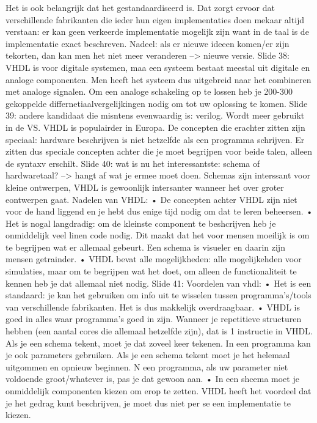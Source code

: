 \documentclass[10pt,a4paper]{book}
\begin{document}
Het is ook belangrijk dat het gestandaardiseerd is. Dat zorgt ervoor dat verschillende fabrikanten die ieder hun eigen implementaties doen mekaar altijd verstaan: er kan geen verkeerde implementatie mogelijk zijn want in de taal is de implementatie exact beschreven. Nadeel: als er nieuwe ideeen komen/er zijn tekorten, dan kan men het niet meer veranderen --> nieuwe versie. 
Slide 38: VHDL is voor digitale systemen, maa een systeem bestaat meestal uit digitale en analoge componenten. Men heeft het systeem dus uitgebreid naar het combineren met analoge signalen. Om een analoge schakeling op te lossen heb je 200-300 gekoppelde differnetiaalvergelijkingen nodig om tot uw oplossing te komen. 
Slide 39: andere kandidaat die misntens evenwaardig is: verilog. Wordt meer gebruikt in de VS. VHDL is populairder in Europa. De concepten die erachter zitten zijn speciaal: hardware beschrijven is niet hetzelfde als een programma schrijven. Er zitten dus speciale concepten achter die je moet begrijpen voor beide talen, alleen de syntaxv erschilt. 
Slide 40: wat is nu het interessantste: schema of hardwaretaal? --> hangt af wat je ermee moet doen. Schemas zijn interssant voor kleine ontwerpen, VHDL is gewoonlijk intersanter wanneer het over groter eontwerpen gaat.
Nadelen van VHDL:
	• De concepten achter VHDL zijn niet voor de hand liggend en je hebt dus enige tijd nodig om dat te leren beheersen. 
	• Het is nogal langdradig: om de kleinste component te beshcrijven heb je onmiddelijk veel linen code nodig. Dit maakt dat het voor mensen moeilijk is om te begrijpen wat er allemaal gebeurt. Een schema is visueler en daarin zijn mensen getrainder.
	• VHDL bevat alle mogelijkheden: alle mogelijkehden voor simulaties, maar om te begrijpen wat het doet, om alleen de functionaliteit te kennen heb je dat allemaal niet nodig.
Slide 41: Voordelen van vhdl:
	• Het is een standaard: je kan het gebruiken om info uit te wisselen tussen programma's/tools van verschillende fabrikanten. Het is dus makkelijk overdraagbaar.
	• VHDL is goed in alles waar programma's goed in zijn. Wanneer je repetitieve structuren hebben (een aantal cores die allemaal hetzelfde zijn), dat is 1 instructie in VHDL. Als je een schema tekent, moet je dat zoveel keer tekenen. In een programma kan je ook parameters gebruiken. Als je een schema tekent moet je het helemaal uitgommen en opnieuw beginnen. N een programma, als uw parameter niet voldoende groot/whatever is, pas je dat gewoon aan.
	• In een shcema moet je onmiddelijk componenten kiezen om erop te zetten. VHDL heeft het voordeel dat je het gedrag kunt beschrijven, je moet dus niet per se een implementatie te kiezen.
\end{document}
